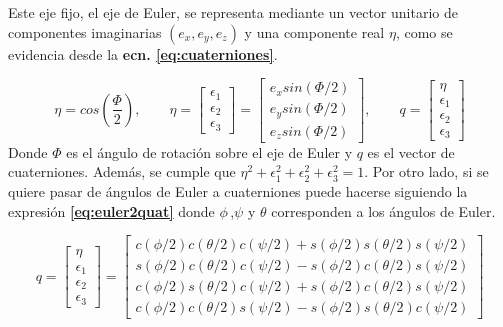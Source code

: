Este eje fijo, el eje de Euler, se representa mediante un vector unitario de componentes imaginarias $(e_x,e_y,e_z)$ y una componente real $\eta$, como se evidencia desde la \textbf{ecn. \eqref{eq:cuaterniones}}. 

\begin{equation}
	\eta = cos\left(\frac{\Phi}{2}\right),
	\qquad
	\eta =\left[\begin{array}{c}
		\epsilon_1\\
		\epsilon_2\\
		 \epsilon_3
	\end{array}\right] =
	\left[\begin{array}{c}
		e_x sin\left(\Phi/2\right)\\
		e_y sin\left(\Phi/2\right)\\
		e_z sin\left(\Phi/2\right)
	\end{array}\right] ,
	\qquad
		q = \left[\begin{array}{c}
			\eta\\
		\epsilon_1\\
		\epsilon_2\\
		\epsilon_3
	\end{array}\right] 
	\label{eq:cuaterniones}
\end{equation}
Donde $\Phi$ es el  ángulo de rotación sobre el eje de Euler y $q$ es el vector de cuaterniones. Además, se cumple que $\eta^2 + \epsilon_1^2+ \epsilon_2^2+ \epsilon_3^2 =1 $. Por otro lado, si se quiere pasar de ángulos de Euler a cuaterniones puede hacerse siguiendo la expresión \textbf{\eqref{eq:euler2quat}} donde $\phi\,$,$\psi$ y $\theta$ corresponden a los ángulos de Euler.

\begin{equation}
q=\left[\begin{array}{c}
	\eta \\
	\epsilon_1 \\
	\epsilon_2 \\
	\epsilon_3
\end{array}\right]=\left[\begin{array}{l}
	c(\phi / 2) c(\theta / 2) c(\psi / 2)+s(\phi / 2) s(\theta / 2) s(\psi / 2) \\
	s(\phi / 2) c(\theta / 2) c(\psi / 2)-s(\phi / 2) c(\theta / 2) s(\psi / 2) \\
	c(\phi / 2) s(\theta / 2) c(\psi / 2)+s(\phi / 2) c(\theta / 2) s(\psi / 2) \\
	c(\phi / 2) c(\theta / 2) s(\psi / 2)-s(\phi / 2) s(\theta / 2) c(\psi / 2)
\end{array}\right]\label{eq:euler2quat}
\end{equation}


